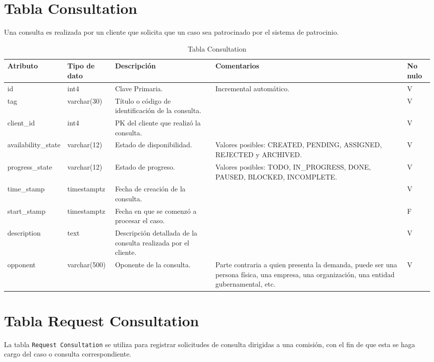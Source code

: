 \section{Tabla Consultation}\label{sec:table-consultation}
Una consulta es realizada por un cliente que solicita que un caso sea patrocinado por el sistema de patrocinio.

\begin{table}[H]
\centering
\label{tab:consultation}
\begin{tabular}{|p{3cm}|p{2.5cm}|p{4.5cm}|p{4cm}|p{1cm}|}
\hline
\textbf{Atributo} & \textbf{Tipo de dato}  & \textbf{Descripción} & \textbf{Comentarios} & \textbf{No nulo} \\ \hline
id & int4 & Clave Primaria. & Incremental automático. & V \\ \hline
tag & varchar(30) & Título o código de identificación de la consulta. & & V \\ \hline
client\_id & int4 & PK del cliente que realizó la consulta. & & V \\ \hline
availability\_state & varchar(12) & Estado de disponibilidad. & Valores posibles: CREATED, PENDING, ASSIGNED, REJECTED y ARCHIVED. & V \\ \hline
progress\_state & varchar(12)  & Estado de progreso. & Valores posibles: TODO, IN\_PROGRESS, DONE, PAUSED, BLOCKED, INCOMPLETE. & V \\ \hline
time\_stamp & timestamptz & Fecha de creación de la consulta. &  & V \\ \hline
start\_stamp & timestamptz & Fecha en que se comenzó a procesar el caso. &  & F \\ \hline
description & text & Descripción detallada de la consulta realizada por el cliente. &  & V \\ \hline
opponent & varchar(500) & Oponente de la consulta. &  Parte contraria a quien presenta la demanda, puede ser una persona física, una empresa, una organización, una entidad gubernamental, etc. & V \\ \hline

\end{tabular}
\caption{Tabla Consultation}
\end{table}



\section{Tabla Request Consultation}\label{sec:table-req-consultation}
La tabla \texttt{Request Consultation} se utiliza para registrar solicitudes de consulta dirigidas a una comisión, con el fin de que esta se haga cargo del caso o consulta correspondiente.

